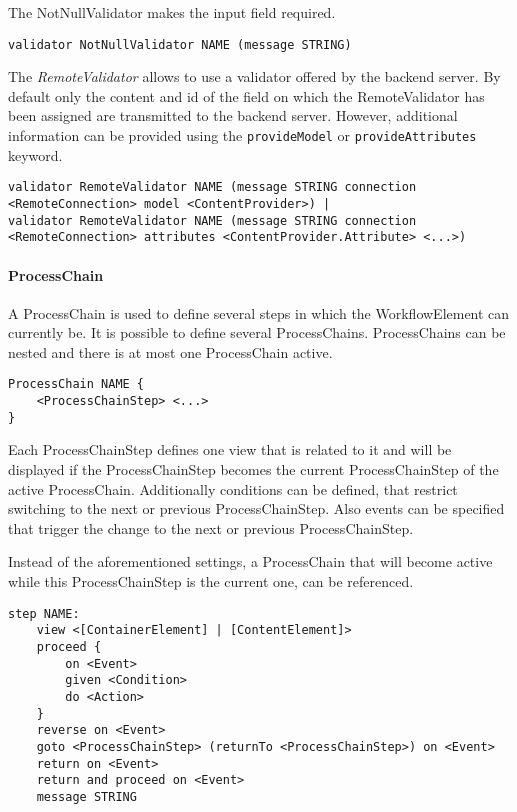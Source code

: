 The NotNullValidator makes the input field required.
\begin{lstlisting}
validator NotNullValidator NAME (message STRING)
\end{lstlisting}

The \textit{RemoteValidator} allows to use a validator offered by the backend server. By default only the content and id of the field on which the RemoteValidator has been assigned are transmitted to the backend server. However, additional information can be provided using the \lstinline!provideModel! or
\lstinline!provideAttributes! keyword.
\begin{lstlisting}
validator RemoteValidator NAME (message STRING connection <RemoteConnection> model <ContentProvider>) |
validator RemoteValidator NAME (message STRING connection <RemoteConnection> attributes <ContentProvider.Attribute> <...>)
\end{lstlisting}

\paragraph{ProcessChain}
\label{sec:processChain}
A ProcessChain is used to define several steps in which the WorkflowElement can currently be. It is possible to define several ProcessChains. ProcessChains can be nested and there is at most one ProcessChain active.
\begin{lstlisting}
ProcessChain NAME {
	<ProcessChainStep> <...>
}
\end{lstlisting}

 Each ProcessChainStep defines one view that is related to it and will be displayed if the ProcessChainStep becomes the current ProcessChainStep of the active ProcessChain. Additionally conditions can be defined, that restrict switching to the next or previous ProcessChainStep. Also events can be specified that trigger the change to the next or previous ProcessChainStep.
 
Instead of the aforementioned settings, a ProcessChain that will become active while this ProcessChainStep is the current one, can be referenced.
\begin{lstlisting}
step NAME:
	view <[ContainerElement] | [ContentElement]>
	proceed {
		on <Event>
		given <Condition>
		do <Action>
	}
	reverse on <Event>
	goto <ProcessChainStep> (returnTo <ProcessChainStep>) on <Event>
	return on <Event>
	return and proceed on <Event>
	message STRING
\end{lstlisting}

